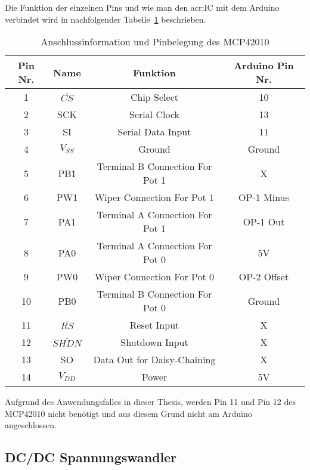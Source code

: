 Die Funktion der einzelnen Pins und wie man den \gls{acr:IC} mit dem Arduino verbindet wird in nachfolgender Tabelle~\ref{tab:pinmcp} beschrieben. 
\begin{table}[htb]
	\begin{center}
		\begin{tabular}[H]{cccc}	
			\toprule
			\textbf{Pin Nr.} & \textbf{Name}  &\textbf{Funktion} & \textbf{Arduino Pin Nr.} \\
			\midrule
			1 & $\overline{CS}$ & Chip Select &  10 \\
			2 & SCK & Serial Clock &  13 \\
			3 & SI & Serial Data Input&  11 \\
			4 & $V_{SS}$ & Ground &  Ground \\
			5 & PB1 & Terminal B Connection For Pot 1 & X \\
			6 & PW1 & Wiper Connection For Pot 1 &  OP-1 Minus \\
			7 & PA1& Terminal A Connection For Pot 1 &  OP-1 Out  \\
			8 & PA0& Terminal A Connection For Pot 0 &  5V \\
			9 & PW0& Wiper Connection For Pot 0 & OP-2 Offset \\
			10 & PB0 & Terminal B Connection For Pot 0 &  Ground \\
			11 & $\overline{RS}$ & Reset Input & X  \\
			12 & $\overline{SHDN}$ & Shutdown Input &X\\
			13 & SO & Data Out for Daisy-Chaining & X \\
			14 & $V_{DD}$ & Power & 5V \\
			\bottomrule
		\end{tabular}
		\caption{Anschlussinformation und Pinbelegung des MCP42010}
		\label{tab:pinmcp}
	\end{center}
\end{table}
Aufgrund des Anwendungsfalles in dieser Thesis, werden Pin 11 und Pin 12 des MCP42010 nicht benötigt und aus diesem Grund nicht am Arduino angeschlossen. 

\subsection{DC/DC Spannungswandler}
\label{subsec:Unterabschnitt12}

